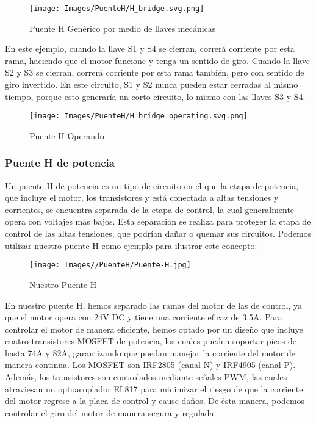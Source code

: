 \documentclass{article}
\begin{document}
\begin{figure}[H]
    \centering
    \texttt{[image: Images/PuenteH/H\_bridge.svg.png]}
    \caption{Puente H Genérico por medio de llaves mecánicas}
\end{figure}

En este ejemplo, cuando la llave S1 y S4 se cierran, correrá corriente por esta rama, haciendo que el motor funcione y tenga un sentido de giro. Cuando la llave S2 y S3 se cierran, correrá corriente por esta rama también, pero con sentido de giro invertido. En este circuito, S1 y S2 nunca pueden estar cerradas al mismo tiempo, porque esto generaría un corto circuito, lo mismo con las llaves S3 y S4.

\begin{figure}[H]
    \centering
    \texttt{[image: Images/PuenteH/H\_bridge\_operating.svg.png]}
    \caption{Puente H Operando}
\end{figure}

\subsubsection{Puente H de potencia}
Un puente H de potencia es un tipo de circuito en el que la etapa de potencia, que incluye el motor, los transistores y está conectada a altas tensiones y corrientes, se encuentra separada de la etapa de control, la cual generalmente opera con voltajes más bajos. Esta separación se realiza para proteger la etapa de control de las altas tensiones, que podrían dañar o quemar sus circuitos. Podemos utilizar nuestro puente H como ejemplo para ilustrar este concepto:

\begin{figure}[H]
    \centering
    \texttt{[image: Images//PuenteH/Puente-H.jpg]}
    \caption{Nuestro Puente H}
    \label{fig:enter-label}
\end{figure}

En nuestro puente H, hemos separado las ramas del motor de las de control, ya que el motor opera con 24V DC y tiene una corriente eficaz de 3,5A. Para controlar el motor de manera eficiente, hemos optado por un diseño que incluye cuatro transistores MOSFET de potencia, los cuales pueden soportar picos de hasta 74A y 82A, garantizando que puedan manejar la corriente del motor de manera continua. Los MOSFET son IRF2805 (canal N) y IRF4905 (canal P). Además, los transistores son controlados mediante señales PWM, las cuales atraviesan un optoacoplador EL817 para minimizar el riesgo de que la corriente del motor regrese a la placa de control y cause daños. De ésta manera, podemos controlar el giro del motor de manera segura y regulada. 
\end{document}
